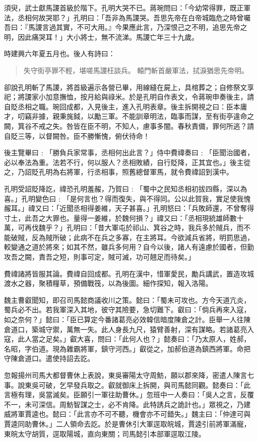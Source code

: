 須臾，武士獻馬謖首級於階下。孔明大哭不已。蔣琬問曰：「今幼常得罪，既正軍法，丞相何故哭耶？」孔明曰：「吾非為馬謖哭。吾思先帝在白帝城臨危之時曾囑吾曰：『馬謖言過其實，不可大用。』今果應此言，乃深恨己之不明，追思先帝之明，因此痛哭耳！」大小將士，無不流涕。馬謖亡年三十九歲。

時建興六年夏五月也。後人有詩曰：

\begin{quote}
失守街亭罪不輕，堪嗟馬謖枉談兵。
轅門斬首嚴軍法，拭淚猶思先帝明。
\end{quote}

卻說孔明斬了馬謖，將首級遍示各營已畢，用線縫在屍上，具棺葬之；自修祭文享祀；將謖家小加意撫恤，按月給與祿米。於是孔明自作表文，令蔣琬申奏後主，請自貶丞相之職。琬回成都，入見後主，進入孔明表章。後主拆開視之曰：臣本庸才，叨竊非據，親秉旄鉞，以勵三軍。不能訓章明法，臨事而謀，至有街亭違命之闕，箕谷不戒之失。咎皆在臣不明，不知人，慮事多闇。春秋責備，罪何所逃？請自貶三等，以督闕咎。臣不勝慚愧，俯伏待命！

後主覽畢曰﹕「勝負兵家常事，丞相何出此言？」侍中費禕奏曰﹕「臣聞治國者，必以奉法為重。法若不行，何以服人？丞相敗績，自行貶降，正其宜也。」後主從之，乃詔貶孔明為右將軍，行丞相事，照舊總督軍馬，就令費禕詔到漢中。

孔明受詔貶降訖，禕恐孔明羞赧，乃賀曰﹕「蜀中之民知丞相初拔四縣，深以為喜。」孔明變色曰﹕「是何言也？得而復失，與不得同。公以此賀我，實足使我愧赧耳。」禕又曰：「近聞丞相得姜維，天子甚喜。」孔明怒曰：「兵敗師還，不曾奪得寸土，此吾之大罪也。量得一姜維，於魏何損？」禕又曰：「丞相現統雄師數十萬，可再伐魏乎？」孔明曰：「昔大軍屯於祁山、箕谷之時，我兵多於賊兵，而不能破賊，反為賊所破；此病不在兵之多寡，在主將耳。今欲減兵省將，明罰思過，較變通之道於將來；如其不然，雖兵多何用？自今以後，諸人有遠慮於國者，但勤攻吾之闕，責吾之短，則事可定，賊可滅，功可翹足而待矣。」

費禕諸將皆服其論。費禕自回成都。孔明在漢中，惜軍愛民，勵兵講武，置造攻城渡水之器，聚積糧草，預備戰筏，以為後圖。細作探知，報入洛陽。

魏主曹叡聞知，即召司馬懿商議收川之策。懿曰：「蜀未可攻也。方今天道亢炎，蜀兵必不出。若我軍深入其地，彼守其險要，急切難下。叡曰：「倘兵再來入寇，如之奈何？」懿曰：「臣已算定今番諸葛亮必效韓信暗度陳倉之計。臣舉一人往陳倉道口，築城守禦，萬無一失。此人身長九尺，猿臂善射，深有謀略。若諸葛亮入寇，此人當之足矣。」叡大喜，問曰：「此何人也？」懿奏曰：「乃太原人，姓郝，名昭，字伯道。現為雜霸將軍，鎮守河西。」叡從之，加郝伯道為鎮西將軍。命把守陳倉道口。遣使持詔去訖。

忽報揚州司馬大都督曹休上表說，東吳審陽太守周魴，願以郡來降，密遣人陳言七事。說東吳可破，乞早發兵取之。叡就御床上拆開，與司馬懿同觀。懿奏曰：「此言極有理，吳當滅矣。臣願引一軍往助曹休。」忽班中一人奏曰：「吳人之言，反覆不一，未可深信。周魴智謀之士，必不肯降。此特誘兵之詭計也。」眾視之，乃建威將軍賈逵也。懿曰：「此言亦不可不聽，機會亦不可錯失。」魏主曰：「仲達可與賈逵同助曹休。」二人領命去訖。於是曹休引大軍逕取皖城，賈逵引前將軍滿寵，東皖太守胡質，逕取陽城，直向東關；司馬懿引本部軍逕取江陵。


